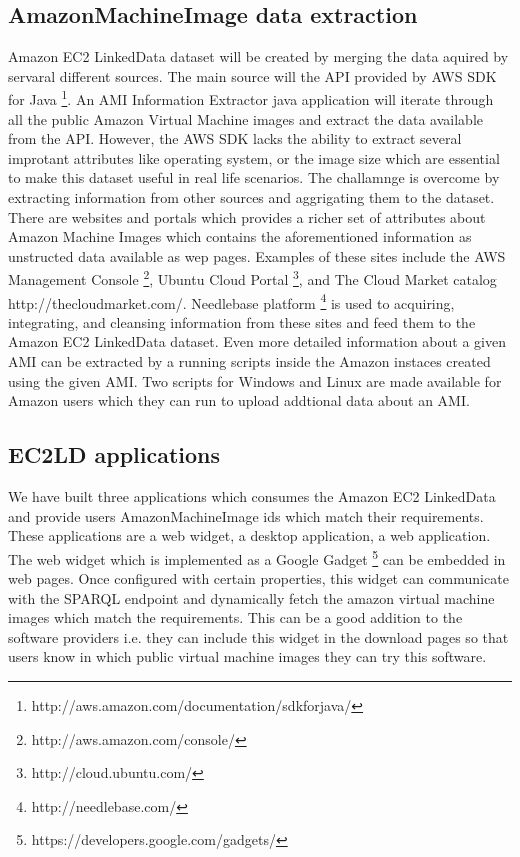 \subsection{AmazonMachineImage data extraction}
Amazon EC2 LinkedData dataset will be created by merging the data aquired by servaral different sources. The main source will the API provided by AWS SDK for Java \footnote{http://aws.amazon.com/documentation/sdkforjava/}. An AMI Information Extractor java application will iterate through all the public Amazon Virtual Machine images and extract the data available from the API. However, the AWS SDK lacks the ability to extract several improtant attributes like operating system, or the image size which are essential to make this dataset useful in real life scenarios. The challamnge is overcome by extracting information from other sources and aggrigating them to the dataset. There are websites and portals which provides a richer set of attributes about Amazon Machine Images which contains the aforementioned information as unstructed data available as wep pages. Examples of these sites include the AWS Management Console \footnote{http://aws.amazon.com/console/}, Ubuntu Cloud Portal \footnote{http://cloud.ubuntu.com/}, and The Cloud Market catalog {http://thecloudmarket.com/}. Needlebase platform \footnote{http://needlebase.com/} is used to acquiring, integrating, and cleansing information from these sites and feed them to the Amazon EC2 LinkedData dataset. Even more detailed information about a given AMI can be extracted by a running scripts inside the Amazon instaces created using the given AMI. Two scripts for Windows and Linux are made available for Amazon users which they can run to upload addtional data about an AMI.       

\subsection{EC2LD applications}
We have built three applications which consumes the Amazon EC2 LinkedData and provide users AmazonMachineImage ids which match their requirements. These applications are a web widget, a desktop application, a web application. The web widget which is implemented as a Google Gadget \footnote{https://developers.google.com/gadgets/} can be embedded in web pages. Once configured with certain properties, this widget can communicate with the SPARQL endpoint and dynamically fetch the amazon virtual machine images which match the requirements. This can be a good addition to the software providers i.e. they can include this widget in the download pages so that users know in which public virtual machine images they can try this software.

